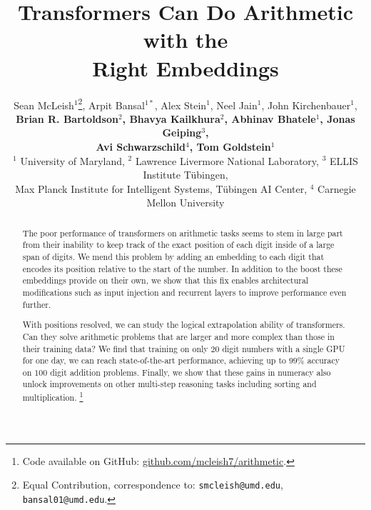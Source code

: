 \documentclass{article}
\title{Transformers Can Do Arithmetic with the\\ Right Embeddings}
\author{
Sean McLeish$^{1}$\thanks{Equal Contribution, correspondence to: \texttt{smcleish@umd.edu}, \texttt{bansal01@umd.edu}.}, Arpit Bansal$^{1*}$, Alex Stein$^{1}$,  Neel Jain$^{1}$, John Kirchenbauer$^{1}$,\\ 
\textbf{Brian R. Bartoldson$^{2}$, Bhavya Kailkhura$^{2}$, Abhinav Bhatele$^{1}$, Jonas Geiping$^{3}$,}\\ 
\textbf{Avi Schwarzschild$^{4}$, Tom Goldstein$^{1}$} \\
{$^{1}$ University of Maryland, 
$^{2}$ Lawrence Livermore National Laboratory,}
$^{3}$ ELLIS Institute T\"ubingen,\\ Max Planck Institute for Intelligent Systems, T\"ubingen AI Center, 
$^{4}$ Carnegie Mellon University
}
\begin{document}
\maketitle


\begin{abstract}
 The poor performance of transformers on arithmetic tasks seems to stem in large part from their inability to keep track of the exact position of each digit inside of a large span of digits.
We mend this problem by adding an embedding to each digit that encodes its position relative to the start of the number.  
In addition to the boost these embeddings provide on their own, we show that this fix enables architectural modifications such as input injection and recurrent layers to improve performance even further.

With positions resolved, we can study the logical extrapolation ability of transformers.
Can they solve arithmetic problems that are larger and more complex than those in their training data?
We find that training on only $20$ digit numbers with a single GPU for one day, we can reach state-of-the-art performance, achieving up to $99\%$ accuracy on $100$ digit addition problems.
Finally, we show that these gains in numeracy also unlock improvements on other multi-step reasoning tasks including sorting and multiplication. 
\footnote{ Code available on GitHub: 
\href{https://github.com/mcleish7/arithmetic}{github.com/mcleish7/arithmetic}. }

\end{abstract}
\end{document}
